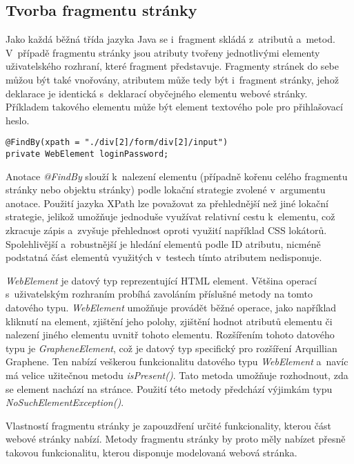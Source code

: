 \documentclass[
    color,   %
	table,   %
    twoside, %
    nolot, nolof,
]{fithesis3}
\begin{document}
\subsection*{Tvorba fragmentu stránky}

Jako každá běžná třída jazyka Java se i~fragment skládá z~atributů a~metod. V~případě fragmentu stránky jsou atributy tvořeny jednotlivými elementy uživatelského rozhraní, které fragment představuje. Fragmenty stránek do sebe můžou být také vnořovány, atributem může tedy být i~fragment stránky, jehož deklarace je identická s~deklarací obyčejného elementu webové stránky. Příkladem takového elementu může být element textového pole pro přihlašovací heslo. 

\begin{lstlisting}
@FindBy(xpath = "./div[2]/form/div[2]/input")
private WebElement loginPassword;
\end{lstlisting} 

Anotace \emph{@FindBy} slouží k~nalezení elementu (případně kořenu celého fragmentu stránky nebo objektu stránky) podle lokační strategie zvolené v~argumentu anotace. Použití jazyka XPath lze považovat za přehlednější než jiné lokační strategie, jelikož umožňuje jednoduše využívat relativní cestu k~elementu, což zkracuje zápis a~zvyšuje přehlednost oproti využití například CSS lokátorů. Spolehlivější a~robustnější je hledání elementů podle ID atributu, nicméně podstatná část elementů využitých v~testech tímto atributem nedisponuje.

\emph{WebElement} je datový typ reprezentující HTML element. Většina operací s~uživatelským rozhraním probíhá zavoláním příslušné metody na tomto datového typu. \emph{WebElement} umožňuje provádět běžné operace, jako například kliknutí na element, zjištění jeho polohy, zjištění hodnot atributů elementu či nalezení jiného elementu uvnitř tohoto elementu. Rozšířením tohoto datového typu je \emph{GrapheneElement}, což je datový typ specifický pro rozšíření Arquillian Graphene. Ten nabízí veškerou funkcionalitu datového typu \emph{WebElement} a~navíc má velice užitečnou metodu \emph{isPresent()}. Tato metoda umožňuje rozhodnout, zda se element nachází na stránce. Použití této metody předchází výjimkám typu \emph{NoSuchElementException()}.

Vlastností fragmentu stránky je zapouzdření určité funkcionality, kterou část webové stránky nabízí. Metody fragmentu stránky by proto měly nabízet přesně takovou funkcionalitu, kterou disponuje modelovaná webová stránka.
\end{document}
